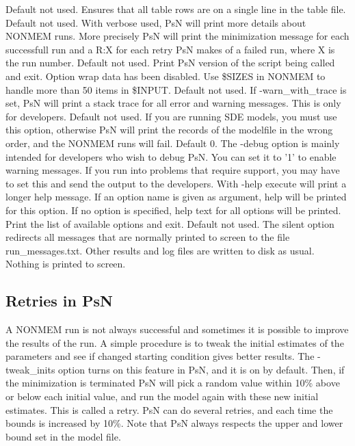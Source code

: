 \begin{optionlist}
\nextopt
{}
Default not used. Ensures that all table rows are on a single line in the table file. 
\nextopt
{}
Default not used. With verbose used, PsN will print more details about NONMEM runs. More precisely PsN will print the minimization message for each successfull run and a R:X for each retry PsN makes of a failed run, where X is the run number. 
\nextopt
{}
Default not used. Print PsN version of the script being called and exit. 
\nextopt
{}
Option wrap data has been disabled. Use \$SIZES in NONMEM to handle more than 50 items in \$INPUT. 
\nextopt
{}
Default not used. If -warn\_with\_trace is set, PsN will print a stack trace for all error and warning messages. This is only for developers. 
\nextopt
{}
Default not used. If you are running SDE models, you must use this option, otherwise PsN will print the records of the modelfile in the wrong order, and the NONMEM runs will fail. 
\nextopt
{}
Default 0. The -debug option is mainly intended for developers who wish to debug PsN. You can set it to '1' to enable warning messages. If you run into problems that require support, you may have to set this and send the output to the developers. 
\nextopt
{}
With -help execute will print a longer help message. If an option name is given as argument, help will be printed for this option. If no option is specified, help text for all options will be printed. 
\nextopt
{}
Print the list of available options and exit. 
\nextopt
{}
Default not used. The silent option redirects all messages that are normally printed to screen to the file run\_messages.txt. Other results and log files are written to disk as usual. Nothing is printed to screen. 
\nextopt
\end{optionlist}


\subsection{Retries in PsN}

A NONMEM run is not always successful and sometimes it is possible to improve the results of the run. A simple procedure is to tweak the initial estimates of the parameters and see if changed starting condition gives better results. The -tweak\_inits option turns on this feature in PsN, and it is on by default. Then, if the minimization is terminated PsN will pick a random value within 10\% above or below each initial value, and run the model again with these new initial estimates. This is called a retry. PsN can do several retries, and each time the bounds is increased by 10\%. Note that PsN always respects the upper and lower bound set in the model file. 

